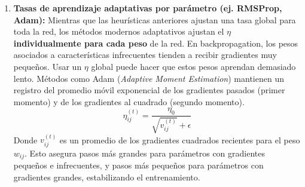 \begin{enumerate}
    \item \textbf{Tasas de aprendizaje adaptativas por parámetro (ej. RMSProp, Adam):}
    Mientras que las heurísticas anteriores ajustan una tasa global para toda la red, los métodos modernos adaptativos ajustan el $\eta$ \textbf{individualmente para cada peso} de la red.
    En backpropagation, los pesos asociados a características infrecuentes tienden a recibir gradientes muy pequeños. Usar un $\eta$ global puede hacer que estos pesos aprendan demasiado lento. Métodos como Adam (\textit{Adaptive Moment Estimation}) mantienen un registro del promedio móvil exponencial de los gradientes pasados (primer momento) y de los gradientes al cuadrado (segundo momento).
    \begin{equation}
        \eta_{ij}^{(t)} = \frac{\eta_0}{\sqrt{v_{ij}^{(t)}} + \epsilon}
    \end{equation}
    Donde $v_{ij}^{(t)}$ es un promedio de los gradientes cuadrados recientes para el peso $w_{ij}$. Esto asegura pasos más grandes para parámetros con gradientes pequeños e infrecuentes, y pasos más pequeños para parámetros con gradientes grandes, estabilizando el entrenamiento.
\end{enumerate}
